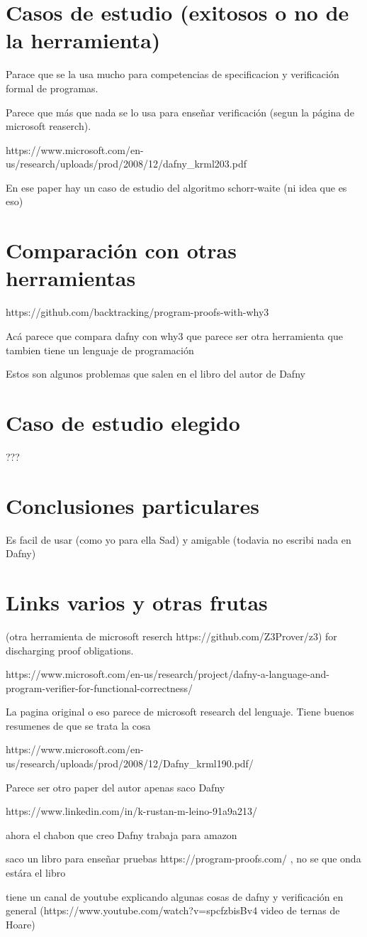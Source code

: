 \documentclass[runningheads]{llncs}
\begin{document}
\section{Casos de estudio (exitosos o no de la herramienta)}
Parace que se la usa mucho para competencias de specificacion y verificación formal de programas.

Parece que más que nada se lo usa para enseñar verificación (segun la página de microsoft reaserch).

https://www.microsoft.com/en-us/research/uploads/prod/2008/12/dafny\_krml203.pdf

En ese paper hay un caso de estudio del algoritmo schorr-waite (ni idea que es eso)

\section{Comparación con otras herramientas}
https://github.com/backtracking/program-proofs-with-why3

Acá parece que compara dafny con why3 que parece ser otra herramienta que tambien tiene un lenguaje de programación

Estos son algunos problemas que salen en el libro del autor de Dafny

\section{Caso de estudio elegido}
???

\section{Conclusiones particulares}
Es facil de usar (como yo para ella Sad) y amigable (todavia no escribi nada en Dafny)

\section{Links varios y otras frutas}
(otra herramienta de microsoft reserch https://github.com/Z3Prover/z3) for discharging proof obligations.

https://www.microsoft.com/en-us/research/project/dafny-a-language-and-program-verifier-for-functional-correctness/

La pagina original o eso parece de microsoft research del lenguaje. Tiene buenos resumenes de que se trata la cosa

https://www.microsoft.com/en-us/research/uploads/prod/2008/12/Dafny\_krml190.pdf/

Parece ser otro paper del autor apenas saco Dafny

https://www.linkedin.com/in/k-rustan-m-leino-91a9a213/

ahora el chabon que creo Dafny trabaja para amazon

saco un libro para enseñar pruebas https://program-proofs.com/ , no se que onda estára el libro

tiene un canal de youtube explicando algunas cosas de dafny y verificación en general (https://www.youtube.com/watch?v=spcfzbisBv4 video de ternas de Hoare)
\end{document}
